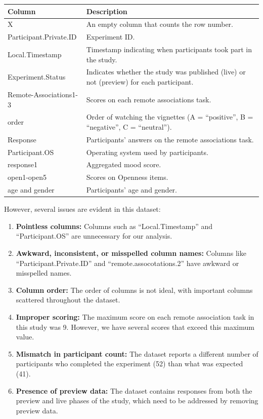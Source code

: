 \documentclass[
]{book}
\begin{document}
\begin{longtable}[]{@{}
  >{\raggedright\arraybackslash}p{}
  >{\raggedright\arraybackslash}p{}@{}}
\toprule\noalign{}
\begin{minipage}[b]{\linewidth}\raggedright
Column
\end{minipage} & \begin{minipage}[b]{\linewidth}\raggedright
Description
\end{minipage} \\
\midrule\noalign{}
\endhead
\bottomrule\noalign{}
\endlastfoot
X & An empty column that counts the row number. \\
Participant.Private.ID & Experiment ID. \\
Local.Timestamp & Timestamp indicating when participants took part in the study. \\
Experiment.Status & Indicates whether the study was published (live) or not (preview) for each participant. \\
Remote-Associations1-3 & Scores on each remote associations task. \\
order & Order of watching the vignettes (A = ``positive'', B = ``negative'', C = ``neutral''). \\
Response & Participants' answers on the remote associations task. \\
Participant.OS & Operating system used by participants. \\
response1 & Aggregated mood score. \\
open1-open5 & Scores on Openness items. \\
age and gender & Participants' age and gender. \\
\end{longtable}

However, several issues are evident in this dataset:

\begin{enumerate}
\def\labelenumi{\arabic{enumi}.}
\item
  \textbf{Pointless columns:} Columns such as ``Local.Timestamp'' and ``Participant.OS'' are unnecessary for our analysis.
\item
  \textbf{Awkward, inconsistent, or misspelled column names:} Columns like ``Participant.Private.ID'' and ``remote.assocotations.2'' have awkward or misspelled names.
\item
  \textbf{Column order:} The order of columns is not ideal, with important columns scattered throughout the dataset.
\item
  \textbf{Improper scoring:} The maximum score on each remote association task in this study was 9. However, we have several scores that exceed this maximum value.
\item
  \textbf{Mismatch in participant count:} The dataset reports a different number of participants who completed the experiment (52) than what was expected (41).
\item
  \textbf{Presence of preview data:} The dataset contains responses from both the preview and live phases of the study, which need to be addressed by removing preview data.
\end{enumerate}
\end{document}
